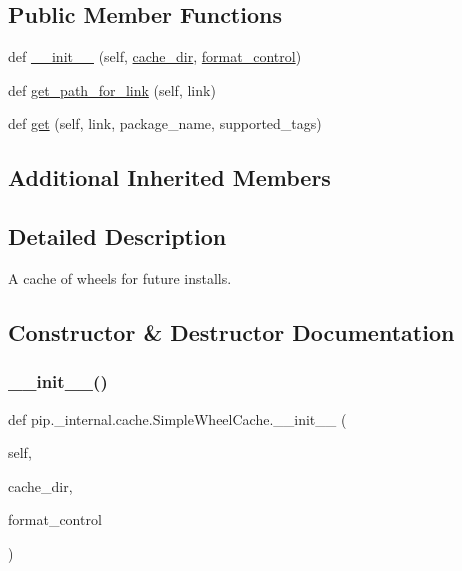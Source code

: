 \subsection*{Public Member Functions}
\begin{DoxyCompactItemize}
\item 
def \hyperlink{classpip_1_1__internal_1_1cache_1_1SimpleWheelCache_ae12000cbda165a27da69d1092ee27e6b}{\+\_\+\+\_\+init\+\_\+\+\_\+} (self, \hyperlink{classpip_1_1__internal_1_1cache_1_1Cache_aed8f0121963b4d3095aaa0b2ea344012}{cache\+\_\+dir}, \hyperlink{classpip_1_1__internal_1_1cache_1_1Cache_ac6051e5c3dff9ba7c7e5968e82acc9d2}{format\+\_\+control})
\item 
def \hyperlink{classpip_1_1__internal_1_1cache_1_1SimpleWheelCache_a5b04113ac54d5249bcc820eef21032cb}{get\+\_\+path\+\_\+for\+\_\+link} (self, link)
\item 
def \hyperlink{classpip_1_1__internal_1_1cache_1_1SimpleWheelCache_a1e90e1583e0c82aea5e0382d53185f35}{get} (self, link, package\+\_\+name, supported\+\_\+tags)
\end{DoxyCompactItemize}
\subsection*{Additional Inherited Members}


\subsection{Detailed Description}
\begin{DoxyVerb}A cache of wheels for future installs.
\end{DoxyVerb}
 

\subsection{Constructor \& Destructor Documentation}
\mbox{\label{classpip_1_1__internal_1_1cache_1_1SimpleWheelCache_ae12000cbda165a27da69d1092ee27e6b}} 
\subsubsection{\texorpdfstring{\+\_\+\+\_\+init\+\_\+\+\_\+()}{\_\_init\_\_()}}
{\footnotesize\ttfamily def pip.\+\_\+internal.\+cache.\+Simple\+Wheel\+Cache.\+\_\+\+\_\+init\+\_\+\+\_\+ (\begin{DoxyParamCaption}\item[{}]{self,  }\item[{}]{cache\+\_\+dir,  }\item[{}]{format\+\_\+control }\end{DoxyParamCaption})}



